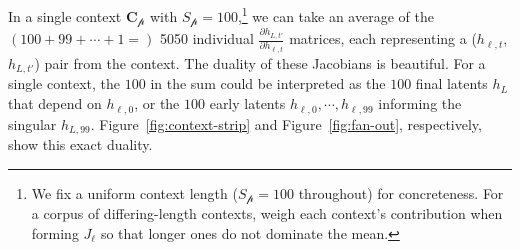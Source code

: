 \documentclass{article}
\begin{document}
\begin{figure}[htbp]
\label{fig:two-modes}
\end{figure}

In a single context \(\mathbf{C}_{\mathscr{p}}\) with \(S_{\mathscr{p}} =  100\),\footnote{We fix a uniform context length (\(S_{\mathscr{p}} = 100\) throughout) for concreteness. For a corpus of differing-length contexts, weigh each context's contribution when forming \(J_\ell\) so that longer ones do not dominate the mean.} we can take an average of the \((100 + 99 + \cdots + 1 =)\) 5050 individual \(\frac{\partial h_{L,t'}}{\partial h_{\ell,t}}\) matrices, each representing a (\(h_{\ell,t}\), \(h_{L, t'}\)) pair from the context. The duality of these Jacobians is beautiful. For a single context, the \(100\) in the sum could be interpreted as the \(100\) final latents \(h_{L}\) that depend on \(h_{\ell,0}\), or the \(100\) early latents \(h_{\ell,0}, \cdots, h_{\ell,99}\) informing the singular \(h_{L,99}\). Figure~\ref{fig:context-strip} and Figure~\ref{fig:fan-out}, respectively, show this exact duality. 
\end{document}
